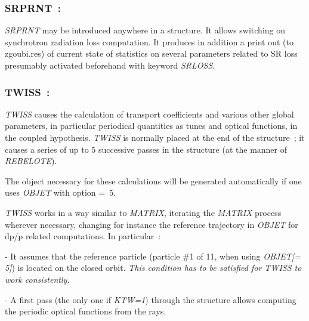 \newpage

\subsubsection*{SRPRNT~: \SRPRNTTitl}\label{SRPRNT}
\medskip 

\noindent\textsl{SRPRNT} may be introduced anywhere in a structure. It allows switching on 
synchrotron radiation loss computation. It produces in addition 
a print out (to zgoubi.res) of current state of statistics on several parameters related to 
SR loss  presumably  activated beforehand with keyword \textsl{SRLOSS}. 



 \newpage


\subsubsection*{TWISS~: \TWISSTitl}\label{TWISS} 
\medskip

\textsl{TWISS}   causes the calculation of 
  transport coefficients and various other global parameters, in particular 
periodical quantities as tunes and optical functions, in the coupled hypothesis.  
 \textsl{TWISS} is normally placed at the end of the structure~; it  causes a series 
of up to 5 successive passes in the structure (at the manner of \textsl{REBELOTE}). 

\medskip 

\noindent  The object necessary for these calculations 
  will be generated automatically if one uses \textsl{OBJET}  with
option \mbox{\KOBJ= 5}.   

 \medskip 

\noindent \textsl{TWISS} works in a way similar to \textsl{MATRIX}, iterating the \textsl{MATRIX} process wherever necessary, 
changing for instance the reference trajectory in \textsl{OBJET} for dp/p related computations. 
\noindent In particular~: 

\medskip

- It assumes that the reference particle (particle \#1 of 11, when using \textsl{OBJET[\KOBJ= 5]}) is located on 
the closed orbit. \textsl{This condition has to be satisfied for TWISS to work consistently. }   

- A first pass (the only one if \textsl{KTW=1}) through the structure allows computing the periodic 
optical functions  from the  rays.

